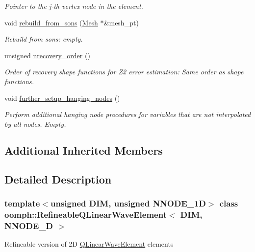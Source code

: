 \begin{DoxyCompactItemize}
\begin{DoxyCompactList}\small\item\em Pointer to the j-\/th vertex node in the element. \end{DoxyCompactList}\item 
void \hyperlink{classoomph_1_1RefineableQLinearWaveElement_a4af9a35f433a96aec249cd77a7cd43ee}{rebuild\+\_\+from\+\_\+sons} (\hyperlink{classoomph_1_1Mesh}{Mesh} $\ast$\&mesh\+\_\+pt)
\begin{DoxyCompactList}\small\item\em Rebuild from sons\+: empty. \end{DoxyCompactList}\item 
unsigned \hyperlink{classoomph_1_1RefineableQLinearWaveElement_af9f398e0ffe8393e627754e1c96a0c37}{nrecovery\+\_\+order} ()
\begin{DoxyCompactList}\small\item\em Order of recovery shape functions for Z2 error estimation\+: Same order as shape functions. \end{DoxyCompactList}\item 
void \hyperlink{classoomph_1_1RefineableQLinearWaveElement_a10ed42f88be49442a29cc4feafd46149}{further\+\_\+setup\+\_\+hanging\+\_\+nodes} ()
\begin{DoxyCompactList}\small\item\em Perform additional hanging node procedures for variables that are not interpolated by all nodes. Empty. \end{DoxyCompactList}\end{DoxyCompactItemize}
\subsection*{Additional Inherited Members}


\subsection{Detailed Description}
\subsubsection*{template$<$unsigned D\+IM, unsigned N\+N\+O\+D\+E\+\_\+1D$>$\newline
class oomph\+::\+Refineable\+Q\+Linear\+Wave\+Element$<$ D\+I\+M, N\+N\+O\+D\+E\+\_\+D $>$}

Refineable version of 2D \hyperlink{classoomph_1_1QLinearWaveElement}{Q\+Linear\+Wave\+Element} elements 

